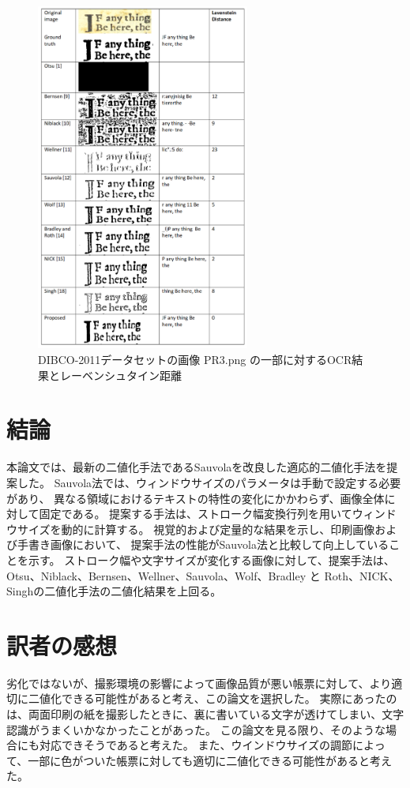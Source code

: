 \documentclass[uplatex, twocolumn,10pt]{jsarticle}
\begin{document}
\begin{figure}[t]
    \begin{center}
        \includegraphics*[width=7cm]{image/master/Fig7.png}
        \caption{DIBCO-2011データセットの画像 PR3.png の一部に対するOCR結果とレーベンシュタイン距離}
        \label{fig7}
    \end{center}
\end{figure}


\section{結論}

本論文では、最新の二値化手法であるSauvolaを改良した適応的二値化手法を提案した。
Sauvola法では、ウィンドウサイズのパラメータは手動で設定する必要があり、
異なる領域におけるテキストの特性の変化にかかわらず、画像全体に対して固定である。
提案する手法は、ストローク幅変換行列を用いてウィンドウサイズを動的に計算する。
視覚的および定量的な結果を示し、印刷画像および手書き画像において、
提案手法の性能がSauvola法と比較して向上していることを示す。
ストローク幅や文字サイズが変化する画像に対して、提案手法は、Otsu、Niblack、Bernsen、Wellner、Sauvola、Wolf、Bradley と Roth、NICK、Singhの二値化手法の二値化結果を上回る。


\section{訳者の感想}
劣化ではないが、撮影環境の影響によって画像品質が悪い帳票に対して、より適切に二値化できる可能性があると考え、この論文を選択した。
実際にあったのは、両面印刷の紙を撮影したときに、裏に書いている文字が透けてしまい、文字認識がうまくいかなかったことがあった。
この論文を見る限り、そのような場合にも対応できそうであると考えた。
また、ウインドウサイズの調節によって、一部に色がついた帳票に対しても適切に二値化できる可能性があると考えた。
\end{document}
